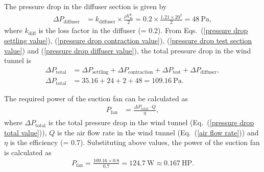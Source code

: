 


The pressure drop in the diffuser section is given by
\begin{align}\label{pressure drop diffuser value}
\Delta P_{\text{diffuser}} &= k_{\text{diffuser}} \times \frac{\rho V_{\text{m}}^2}{2} = 0.2 \times \frac{1.21 \times 20^2}{2} = 48~\text{Pa}, 
\end{align}
where $k_{\text{diff}}$ is the loss factor in the diffuser (= 0.2).
From Eqs.~(\ref{pressure drop settling value}), (\ref{pressure drop contraction value}), (\ref{pressure drop test section value}) and (\ref{pressure drop diffuser value}), the total pressure drop in the wind tunnel is 
\begin{equation}
\begin{aligned}\label{pressure drop total value}
\Delta P_{\text{total}} &= \Delta P_{\text{settling}} + \Delta P_{\text{contraction}} + \Delta P_{\text{test}} + \Delta P_{\text{diffuser}}, \\
\Delta P_{\text{total}} &= 35.16 + 24 + 2 + 48 = 109.16~\text{Pa}.
\end{aligned}
\end{equation}

The required power of the suction fan can be calculated as
\begin{align}
P_{\text{fan}} &= \frac{\Delta P_{\text{total}} \cdot Q}{\eta},
\end{align}
where $\Delta P_{\text{total}}$ is the total pressure drop in the wind tunnel (Eq.~(\ref{pressure drop total value})), $Q$ is the air flow rate in the wind tunnel (Eq.~(\ref{air flow rate})) and $\eta$ is the efficiency (= 0.7). Substituting above values, the power of the suction fan is calculated as
\begin{align}
P_{\text{fan}} = \frac{109.16 \times 0.8}{0.7} = 124.7~\text{W} \approx 0.167~\text{HP}.
\end{align}

